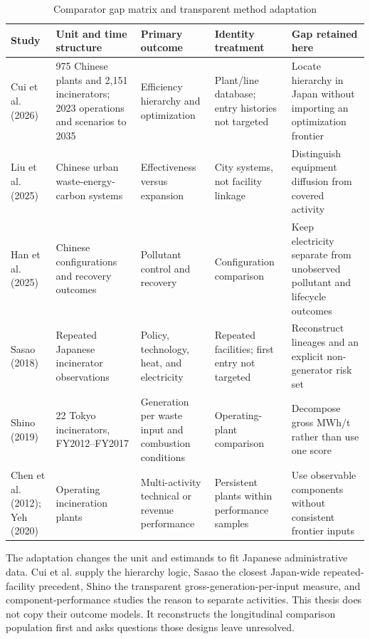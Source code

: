 \documentclass[12pt,letterpaper]{article}
\begin{document}
\begin{table}[H]
\centering
\caption{Comparator gap matrix and transparent method adaptation}
\label{tab:comparators}
\scriptsize
\setlength{\tabcolsep}{3.2pt}
\renewcommand{\arraystretch}{1.14}
\begin{tabularx}{\textwidth}{L{1.45cm}YYYY}
\toprule
Study & Unit and time structure & Primary outcome & Identity treatment &
Gap retained here \\
\midrule
Cui et al. (2026) & 975 Chinese plants and 2,151 incinerators; 2023 operations
and scenarios to 2035 & Efficiency hierarchy and optimization & Plant/line
database; entry histories not targeted & Locate hierarchy in Japan without
importing an optimization frontier \\
Liu et al. (2025) & Chinese urban waste-energy-carbon systems & Effectiveness
versus expansion & City systems, not facility linkage & Distinguish equipment
diffusion from covered activity \\
Han et al. (2025) & Chinese configurations and recovery outcomes & Pollutant
control and recovery & Configuration comparison & Keep electricity separate
from unobserved pollutant and lifecycle outcomes \\
Sasao (2018) & Repeated Japanese incinerator observations & Policy, technology,
heat, and electricity & Repeated facilities; first entry not targeted &
Reconstruct lineages and an explicit non-generator risk set \\
Shino (2019) & 22 Tokyo incinerators, FY2012--FY2017 & Generation per waste input
and combustion conditions & Operating-plant comparison & Decompose gross MWh/t
rather than use one score \\
Chen et al. (2012); Yeh (2020) & Operating incineration plants & Multi-activity
technical or revenue performance & Persistent plants within performance samples
& Use observable components without consistent frontier inputs \\
\bottomrule
\end{tabularx}
\renewcommand{\arraystretch}{1}
\normalsize
\end{table}

The adaptation changes the unit and estimands to fit Japanese administrative
data. Cui et al. supply the hierarchy logic, Sasao the closest Japan-wide
repeated-facility precedent, Shino the transparent gross-generation-per-input
measure, and component-performance studies the reason to separate activities.
This thesis does not copy their outcome models. It reconstructs the longitudinal
comparison population first and asks questions those designs leave unresolved.
\end{document}
